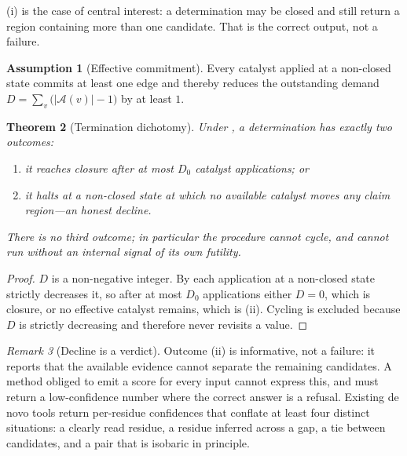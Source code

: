 \documentclass[11pt,a4paper]{article}
\newtheorem{theorem}{Theorem}[section]
\theoremstyle{definition}
\newtheorem{assumption}[theorem]{Assumption}
\theoremstyle{remark}
\newtheorem{remark}[theorem]{Remark}
\newcommand{\amb}{\mathcal{A}}               %
\newcommand{\dem}{D}
\begin{document}
(i) is the case of central interest: a
determination may be closed and still return a region containing more
than one candidate. That is the correct output, not a failure.

\begin{assumption}[Effective commitment]
\label{ass:effective}
Every catalyst applied at a non-closed state commits at least one edge
and thereby reduces the outstanding demand
$\dem=\sum_{v}\bigl(|\amb(v)|-1\bigr)$ by at least $1$.
\end{assumption}

\begin{theorem}[Termination dichotomy]
\label{thm:dichotomy}
Under , a determination has exactly two outcomes:
\begin{enumerate}[label=\textup{(\roman*)},leftmargin=2.2em,itemsep=1pt]
  \item it reaches closure after at most $\dem_0$ catalyst
  applications; or
  \item it halts at a non-closed state at which no available catalyst
  moves any claim region---an \emph{honest decline}.
\end{enumerate}
There is no third outcome; in particular the procedure cannot cycle, and
cannot run without an internal signal of its own futility.
\end{theorem}

\begin{proof}
$\dem$ is a non-negative integer. By  each
application at a non-closed state strictly decreases it, so after at most
$\dem_0$ applications either $\dem=0$, which is closure, or no effective
catalyst remains, which is (ii). Cycling is excluded because $\dem$ is
strictly decreasing and therefore never revisits a value.
\end{proof}

\begin{remark}[Decline is a verdict]
\label{rem:decline}
Outcome (ii) is informative, not a failure: it reports that the available
evidence cannot separate the remaining candidates. A method obliged to
emit a score for every input cannot express this, and must return a
low-confidence number where the correct answer is a refusal. Existing de
novo tools return per-residue confidences that conflate at least four
distinct situations: a clearly read residue, a residue inferred across a
gap, a tie between candidates, and a pair that is isobaric in principle.
\end{remark}
\end{document}
